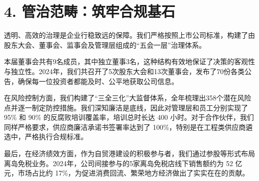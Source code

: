 \documentclass[a4paper,12pt]{article}
\begin{document}
\section{4. 管治范畴：筑牢合规基石}

透明、高效的治理是企业行稳致远的保障。我们严格按照上市公司标准，构建了由股东大会、董事会、监事会及管理层组成的“五会一层”治理体系。

本届董事会共有9名成员，其中独立董事3名，这种结构有效地保证了决策的客观性与独立性。2024年，我们共召开了5次股东大会和13次董事会，发布了70份各类公告，确保每一位投资者都能及时、公平地获取公司信息。

在风险控制方面，我们构建了“三全三化”大监督体系，全年梳理出358个潜在风险点并逐一制定防控措施。我们深知廉洁是底线，因此对管理层和员工分别实现了 95\% 和 90\% 的反腐败培训覆盖率，培训总时长达 400 小时。对于合作伙伴，我们同样严格要求，供应商廉洁承诺书签署率达到了 100\%，特别是在工程类供应商遴选中，严格执行合规标准。

最后，在经济绩效方面，作为自贸港建设的积极参与者，我们通过参股等形式布局离岛免税业务。2024年，公司间接参与的5家离岛免税店线下销售额约为 52 亿元，市场占比约 17\%，为促进消费回流、繁荣地方经济做出了实实在在的贡献。
\end{document}
